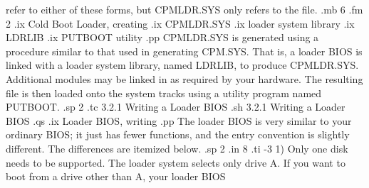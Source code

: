 refer to either of these forms, but CPMLDR.SYS only refers to the file.
.mb 6
.fm 2
.ix Cold Boot Loader, creating
.ix CPMLDR.SYS
.ix loader system library
.ix LDRLIB
.ix PUTBOOT utility
.pp
CPMLDR.SYS is generated using a procedure similar to that used in generating
CPM.SYS.  That is, a loader BIOS is linked with a loader system library, named
LDRLIB, to produce CPMLDR.SYS.  Additional modules may be linked in as required
by your hardware.  The resulting file is then loaded onto the system tracks
using a utility program named PUTBOOT.  
.sp 2
.tc         3.2.1  Writing a Loader BIOS
.sh
3.2.1  Writing a Loader BIOS
.qs
.ix Loader BIOS, writing
.pp
The loader BIOS is very similar to your ordinary BIOS; it just has fewer
functions, and the entry convention is slightly different.  The differences
are itemized below.
.sp 2
.in 8
.ti -3
1) Only one disk needs to be supported.  The loader system selects only 
drive A.  If you want to boot from a drive other than A, your loader BIOS 

